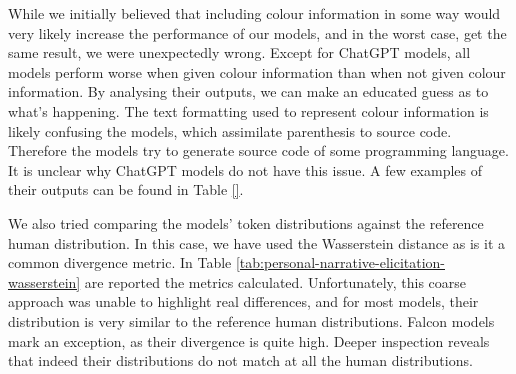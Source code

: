 While we initially believed that including colour information in some way would very likely increase the performance of our models, and in the worst case, get the same result, we were unexpectedly wrong. Except for ChatGPT models, all models perform worse when given colour information than when not given colour information. By analysing their outputs, we can make an educated guess as to what's happening. The text formatting used to represent colour information is likely confusing the models, which assimilate parenthesis to source code. Therefore the models try to generate source code of some programming language. It is unclear why ChatGPT models do not have this issue. A few examples of their outputs can be found in Table \ref{}.


We also tried comparing the models' token distributions against the reference human distribution. In this case, we have used the Wasserstein distance \cite{wasserstein} as is it a common divergence metric. In Table \ref{tab:personal-narrative-elicitation-wasserstein} are reported the metrics calculated. Unfortunately, this coarse approach was unable to highlight real differences, and for most models, their distribution is very similar to the reference human distributions. Falcon models mark an exception, as their divergence is quite high. Deeper inspection reveals that indeed their distributions do not match at all the human distributions. 
